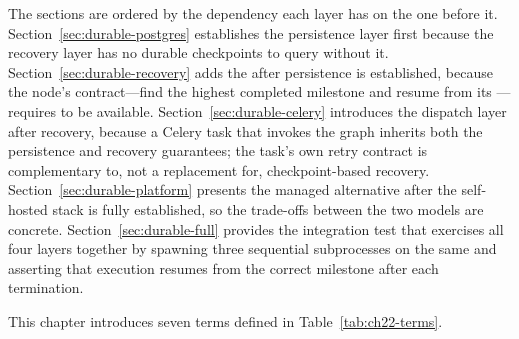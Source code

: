The sections are ordered by the dependency each layer has on the one
before it.
Section~\ref{sec:durable-postgres} establishes the persistence layer
first because the recovery layer has no durable checkpoints to query
without it.
Section~\ref{sec:durable-recovery} adds the  after
persistence is established, because the node's contract---find the
highest completed milestone and resume from its
---requires
 to be available.
Section~\ref{sec:durable-celery} introduces the dispatch layer after
recovery, because a Celery task that invokes the graph inherits both
the persistence and recovery guarantees; the task's own retry contract
is complementary to, not a replacement for, checkpoint-based recovery.
Section~\ref{sec:durable-platform} presents the managed alternative
after the self-hosted stack is fully established, so the trade-offs
between the two models are concrete.
Section~\ref{sec:durable-full} provides the integration test that
exercises all four layers together by spawning three sequential
subprocesses on the same  and asserting that execution
resumes from the correct milestone after each termination.

This chapter introduces seven terms defined in
Table~\ref{tab:ch22-terms}.

